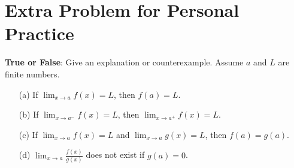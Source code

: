 \documentclass[handout,nooutcomes]{ximera}
\begin{document}
\section{Extra Problem for Personal Practice}
\label{section:extra-problems}
\begin{problem}
  \textbf{True or False}: Give an explanation or counterexample.
  Assume $a$ and $L$ are finite numbers.
  \begin{itemize}
    \item[(a)]
      If $ \lim_{x \to a} f(x) = L$, then $f(a) = L$.
    \item[(b)]
      If $  \lim_{x \to a^-} f(x) = L$, then $  \lim_{x \to a^+} f(x) = L $.
    \item[(c)]
      If $ \lim_{x \to a} f(x) = L $ and $  \lim_{x \to a} g(x) = L $, then $f(a) = g(a)$.
    \item[(d)]
       $ \lim_{x \to a} \frac{f(x)}{g(x)} $ does not exist if $g(a) = 0$.
  \end{itemize}
\end{problem}



	
	 	
	
	
\end{document}
